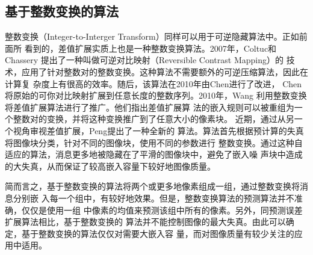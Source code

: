 \subsection{基于整数变换的算法}
整数变换（Integer-to-Interger Transform）同样可以用于可逆隐藏算法中。正如前面所
看到的，差值扩展实质上也是一种整数变换算法。2007年，Coltuc和Chassery
\cite{coltuc2007very}提出了一种叫做可逆对比映射（Reversible Contrast Mapping）的
技术，应用了针对整数对的整数变换。这种算法不需要额外的可逆压缩算法，因此在计算复
杂度上有很高的效率。随后，该算法在2010年由Chen进行了改进\cite{chen2010reversible}，
Chen将原始的可你对比映射扩展到任意长度的整数序列。2010年，Wang
\cite{wang2010efficient}利用整数变换将差值扩展算法进行了推广。他们指出差值扩展算
法的嵌入规则可以被重组为一个整数对的变换，并将这种变换推广到了任意大小的像素块。
近期，通过从另一个视角审视差值扩展，Peng\cite{peng2012adaptive}提出了一种全新的
算法。算法首先根据预计算的失真将图像块分类，针对不同的图像块，使用不同的参数进行
整数变换。通过这种自适应的算法，消息更多地被隐藏在了平滑的图像块中，避免了嵌入噪
声块中造成的大失真，从而保证了较高嵌入容量下较好地图像质量。
\par
简而言之，基于整数变换的算法将两个或更多地像素组成一组，通过整数变换将消息分别嵌
入每一个组中，有较好地效果。但是，整数变换算法的预测算法并不准确，仅仅是使用一组
中像素的均值来预测该组中所有的像素。另外，同预测误差扩展算法相比，基于整数变换的
算法并不能控制图像的最大失真。由此可以确定，基于整数变换的算法仅仅对需要大嵌入容
量，而对图像质量有较少关注的应用中适用。

